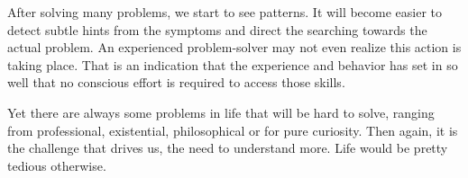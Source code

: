 After solving many problems, we start to see patterns. It will become easier to
detect subtle hints from the symptoms and direct the searching towards the
actual problem. An experienced problem-solver may not even realize this action
is taking place. That is an indication that the experience and behavior has set
in so well that no conscious effort is required to access those skills.

Yet there are always some problems in life that will be hard to solve, ranging
from professional, existential, philosophical or for pure curiosity. Then again,
it is the challenge that drives us, the need to understand more. Life would be
pretty tedious otherwise.
